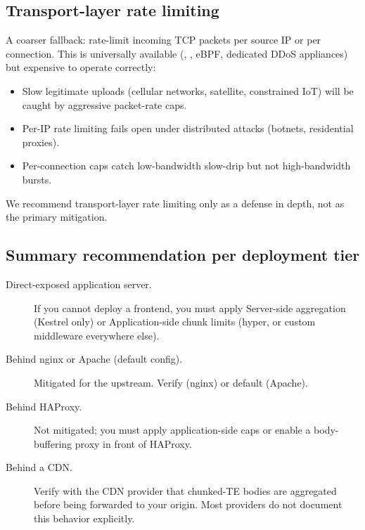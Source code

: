 \subsection{Transport-layer rate limiting}
\label{sec:mit-transport}

A coarser fallback: rate-limit incoming TCP packets per source IP
or per connection. This is universally available (,
, eBPF, dedicated DDoS appliances) but expensive
to operate correctly:

\begin{itemize}
  \item Slow legitimate uploads (cellular networks, satellite,
    constrained IoT) will be caught by aggressive packet-rate
    caps.
  \item Per-IP rate limiting fails open under distributed attacks
    (botnets, residential proxies).
  \item Per-connection caps catch low-bandwidth slow-drip but
    not high-bandwidth bursts.
\end{itemize}

We recommend transport-layer rate limiting only as a defense
in depth, not as the primary mitigation.

\subsection{Summary recommendation per deployment tier}
\label{sec:mit-summary}

\begin{description}
  \item[Direct-exposed application server.] If you cannot deploy
    a frontend, you must apply Server-side aggregation
    (Kestrel only) or Application-side chunk limits (hyper, or
    custom middleware everywhere else).
  \item[Behind nginx or Apache (default config).] Mitigated for the
    upstream. Verify
     (nginx) or
     default (Apache).
  \item[Behind HAProxy.] Not mitigated; you must apply
    application-side caps or enable a body-buffering proxy in
    front of HAProxy.
  \item[Behind a CDN.] Verify with the CDN provider that
    chunked-TE bodies are aggregated before being forwarded to
    your origin. Most providers do not document this behavior
    explicitly.
\end{description}
